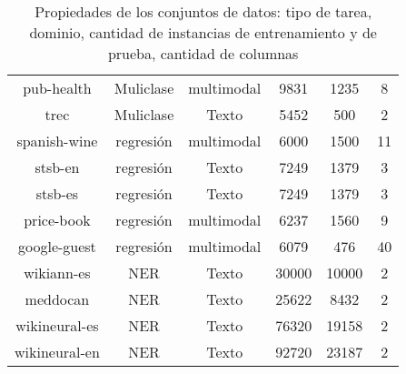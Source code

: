 \begin{annexes}
\begin{table}[H]
{\begin{tabular}{|c|c|c|c|c|c|}
    pub-health                & Muliclase & multimodal &  9831   & 1235 & 8 \\
    trec                      & Muliclase & Texto      &  5452   & 500  & 2 \\
    spanish-wine              & regresión & multimodal &  6000   & 1500 & 11 \\
    stsb-en                   & regresión & Texto      &  7249   & 1379 & 3  \\
    stsb-es                   & regresión & Texto      &  7249   & 1379 & 3 \\
    price-book                & regresión & multimodal &  6237   & 1560 & 9 \\
    google-guest              & regresión & multimodal &  6079   & 476  & 40 \\
    wikiann-es                & NER & Texto  &  30000   & 10000 & 2 \\
    meddocan                  & NER & Texto  &  25622   & 8432 & 2 \\
    wikineural-es             & NER & Texto  &  76320   & 19158 & 2 \\
    wikineural-en             & NER & Texto  &  92720   & 23187 & 2 \\
    \hline
    \end{tabular}
    \caption{Propiedades de los conjuntos de datos: tipo de tarea, dominio, cantidad de instancias de entrenamiento y de prueba, cantidad de columnas}
    \label{tab:data}
    }
\end{table}
  
\end{annexes}


